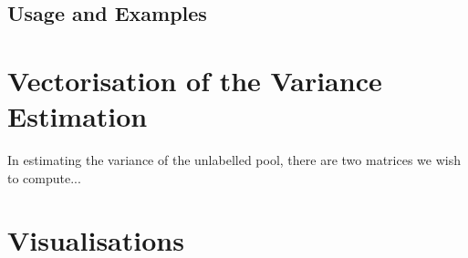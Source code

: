 \section{Usage and Examples}
\label{sec:usage}


\chapter{Vectorisation of the Variance Estimation}
\label{cha:vectorise}

In estimating the variance of the unlabelled pool, there are two matrices we wish to compute...


\chapter{Visualisations}

